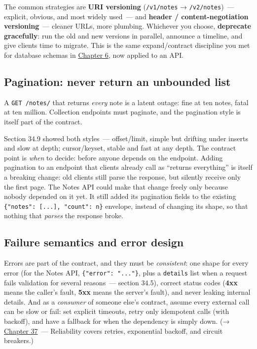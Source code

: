 The common strategies are \textbf{URI versioning} (\texttt{/v1/notes} → \texttt{/v2/notes})~--- explicit, obvious, and most widely used~--- and \textbf{header / content-negotiation versioning}~--- cleaner URLs, more plumbing. Whichever you choose, \textbf{deprecate gracefully}: run the old and new versions in parallel, announce a timeline, and give clients time to migrate. This is the same expand/contract discipline you met for database schemas in \hyperref[ch:06-local-dependencies]{Chapter 6}, now applied to an API.

\subsection*{Pagination: never return an unbounded list}\label{34-response-handling:pagination-never-return-an-unbounded-list}

A \texttt{GET\ /notes/} that returns \emph{every} note is a latent outage: fine at ten notes, fatal at ten million. Collection endpoints must paginate, and the pagination style is itself part of the contract.

Section 34.9 showed both styles~--- offset/limit, simple but drifting under inserts and slow at depth; cursor/keyset, stable and fast at any depth. The contract point is \emph{when} to decide: before anyone depends on the endpoint. Adding pagination to an endpoint that clients already call as ``returns everything'' is itself a breaking change: old clients still parse the response, but silently receive only the first page. The Notes API could make that change freely only because nobody depended on it yet. It still added its pagination fields to the existing \texttt{\{"notes":}\allowbreak{}\texttt{\ {[}.}\allowbreak{}\texttt{.}\allowbreak{}\texttt{.}\allowbreak{}\texttt{{]},}\allowbreak{}\texttt{\ "count":}\allowbreak{}\texttt{\ n\}} envelope, instead of changing its shape, so that nothing that \emph{parses} the response broke.

\subsection*{Failure semantics and error design}\label{34-response-handling:failure-semantics-and-error-design}

Errors are part of the contract, and they must be \emph{consistent}: one shape for every error (for the Notes API, \texttt{\{"error":\ "..."\}}, plus a \texttt{details} list when a request fails validation for several reasons~--- section 34.5), correct status codes (\textbf{4xx} means the caller's fault, \textbf{5xx} means the server's fault), and never leaking internal details. And as a \emph{consumer} of someone else's contract, assume every external call can be slow or fail: set explicit timeouts, retry only idempotent calls (with backoff), and have a fallback for when the dependency is simply down. (→ \hyperref[ch:37-reliability]{Chapter 37}~--- Reliability covers retries, exponential backoff, and circuit breakers.)

